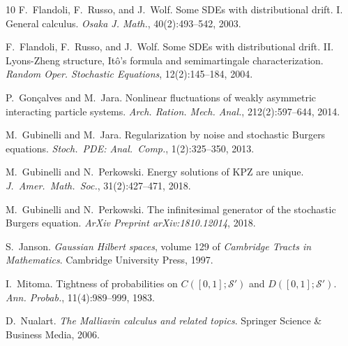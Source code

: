 \documentclass{article}
\newcommand{\tmtextit}[1]{{\itshape{#1}}}
\begin{document}
\begin{thebibliography}{10}
  F.~Flandoli, F.~Russo, and  J.~Wolf.
  {\newblock}Some SDEs with distributional drift. I. General calculus.
  {\newblock}\tmtextit{Osaka J. Math.}, 40(2):493--542, 2003.{\newblock}
  
  F.~Flandoli, F.~Russo, and  J.~Wolf.
  {\newblock}Some SDEs with distributional drift. II. Lyons-Zheng structure,
  It{\^o}'s formula and semimartingale characterization.
  {\newblock}\tmtextit{Random Oper. Stochastic Equations}, 12(2):145--184,
  2004.{\newblock}
  
  P.~Gon{\c c}alves  and  M.~Jara.
  {\newblock}Nonlinear fluctuations of weakly asymmetric interacting particle
  systems. {\newblock}\tmtextit{Arch. Ration. Mech. Anal.}, 212(2):597--644,
  2014.{\newblock}
  
  M.~Gubinelli  and  M.~Jara.
  {\newblock}Regularization by noise and stochastic Burgers equations.
  {\newblock}\tmtextit{Stoch.~PDE: Anal.~Comp.}, 1(2):325--350,
  2013.{\newblock}
  
  M.~Gubinelli  and  N.~Perkowski.
  {\newblock}Energy solutions of KPZ are unique.
  {\newblock}\tmtextit{J.~Amer.~Math.~Soc.}, 31(2):427--471, 2018.{\newblock}
  
  M.~Gubinelli  and  N.~Perkowski.
  {\newblock}The infinitesimal generator of the stochastic Burgers equation.
  {\newblock}\tmtextit{ArXiv Preprint arXiv:1810.12014}, 2018.{\newblock}
  
  S.~Janson. {\newblock}\tmtextit{Gaussian
  Hilbert spaces},  volume  129  of \tmtextit{Cambridge Tracts in
  Mathematics}. {\newblock}Cambridge University Press, 1997.{\newblock}
  
  I.~Mitoma. {\newblock}Tightness of probabilities on
  $C ([0, 1] ; \mathcal{S}')$ and $D ([0, 1] ; \mathcal{S}')$.
  {\newblock}\tmtextit{Ann. Probab.}, 11(4):989--999, 1983.{\newblock}
  
  D.~Nualart. {\newblock}\tmtextit{The
  Malliavin calculus and related topics}. {\newblock}Springer Science \&
  Business Media, 2006.{\newblock}
\end{thebibliography}
\end{document}
